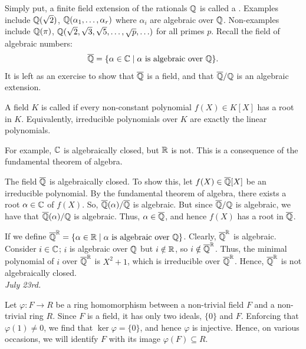 Simply put, a finite field extension of the rationals $\mathbb{Q}$ is called a . Examples include $\mathbb{Q}(\sqrt{2})$, $\mathbb{Q}(\alpha_{1},\ldots,\alpha_{r})$ where $\alpha_{i}$ are algebraic over $\mathbb{Q}$. Non-examples include $\mathbb{Q}(\pi)$, $\mathbb{Q}(\sqrt{2},\sqrt{3},\sqrt{5},\ldots,\sqrt{p},\ldots)$ for all primes $p$. Recall the field of algebraic numbers:
\begin{align}
    \overline{\mathbb{Q}} = \{\alpha \in \mathbb{C} \mid \alpha \text{ is algebraic over } \mathbb{Q}\}.
\end{align}
It is left as an exercise to show that $\overline{\mathbb{Q}}$ is a field, and that $\overline{\mathbb{Q}}/\mathbb{Q}$ is an algebraic extension.

\begin{definition}
    A field $K$ is called  if every non-constant polynomial $f(X) \in K[X]$ has a root in $K$. Equivalently, irreducible polynomials over $K$ are exactly the linear polynomials.
\end{definition}
For example, $\mathbb{C}$ is algebraically closed, but $\mathbb{R}$ is not. This is a consequence of the fundamental theorem of algebra.

\begin{example}
    The field $\overline{\mathbb{Q}}$ is algebraically closed. To show this, let $f(X) \in \overline{\mathbb{Q}}[X]$ be an irreducible polynomial. By the fundamental theorem of algebra, there exists a root $\alpha \in \mathbb{C}$ of $f(X)$. So, $\overline{\mathbb{Q}}(\alpha)/\overline{\mathbb{Q}}$ is algebraic. But since $\overline{\mathbb{Q}}/\mathbb{Q}$ is algebraic, we have that $\overline{\mathbb{Q}}(\alpha)/\mathbb{Q}$ is algebraic. Thus, $\alpha \in \overline{\mathbb{Q}}$, and hence $f(X)$ has a root in $\overline{\mathbb{Q}}$.
\end{example}

If we define $\overline{\mathbb{Q}}^{\mathbb{R}} = \{\alpha \in \mathbb{R} \mid \alpha \text{ is algebraic over } \mathbb{Q}\}$. Clearly, $\overline{\mathbb{Q}}^{\mathbb{R}}$ is algebraic. Consider $i \in \mathbb{C}$; $i$ is algebraic over $\mathbb{Q}$ but $i \notin \mathbb{R}$, so $i \notin \overline{\mathbb{Q}}^{\mathbb{R}}$. Thus, the minimal polynomial of $i$ over $\overline{\mathbb{Q}}^{\mathbb{R}}$ is $X^{2}+1$, which is irreducible over $\overline{\mathbb{Q}}^{\mathbb{R}}$. Hence, $\overline{\mathbb{Q}}^{\mathbb{R}}$ is not algebraically closed. 
\\

\noindent \textit{July 23rd.}

Let $\varphi:F \to R$ be a ring homomorphism between a non-trivial field $F$ and a non-trivial ring $R$. Since $F$ is a field, it has only two ideals, $\{0\}$ and $F$. Enforcing that $\varphi(1) \neq 0$, we find that $\ker \varphi = \{0\}$, and hence $\varphi$ is injective. Hence, on various occasions, we will identify $F$ with its image $\varphi(F) \subseteq R$. 

